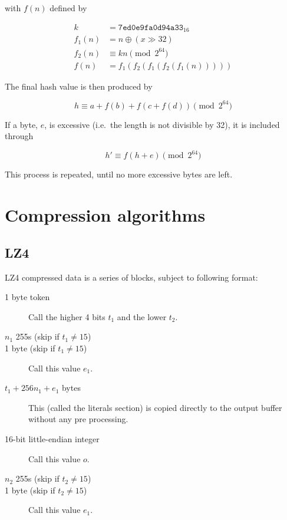 \documentclass[11pt,a4paper]{report}
\begin{document}
        with $f(n)$ defined by

        \begin{align*}
            k      &=      \texttt{7ed0e9fa0d94a33}_{16} \\
            f_1(n) &=      n \oplus (x \gg 32) \\
            f_2(n) &\equiv kn \pmod{2^{64}} \\
            f(n)   &=      f_1(f_2(f_1(f_2(f_1(n)))))
        \end{align*}

        The final hash value is then produced by

        $$h \equiv a + f(b) + f(c + f(d)) \pmod{2^{64}}$$

        If a byte, $e$, is excessive (i.e.\ the length is not divisible by 32), it is included through

        $$h' \equiv f(h + e) \pmod{2^{64}}$$

        This process is repeated, until no more excessive bytes are left.

    \section{Compression algorithms}
        \subsection{LZ4}
        \label{compression:lz4}
        LZ4 compressed data is a series of blocks, subject to following format:

        \begin{description}
            \item [1 byte token] Call the higher 4 bits $t_1$ and the lower $t_2$.
            \item [$n_1$ 255s (skip if $t_1 \neq 15$)]
            \item [1 byte (skip if $t_1 \neq 15$)] Call this value $e_1$.
            \item [$t_1 + 256n_1 + e_1$ bytes] This (called the literals
                section) is copied directly to the output buffer without any
                pre processing.
            \item [16-bit little-endian integer] Call this value $o$.
            \item [$n_2$ 255s (skip if $t_2 \neq 15$)]
            \item [1 byte (skip if $t_2 \neq 15$)] Call this value $e_1$.
        \end{description}
\end{document}

